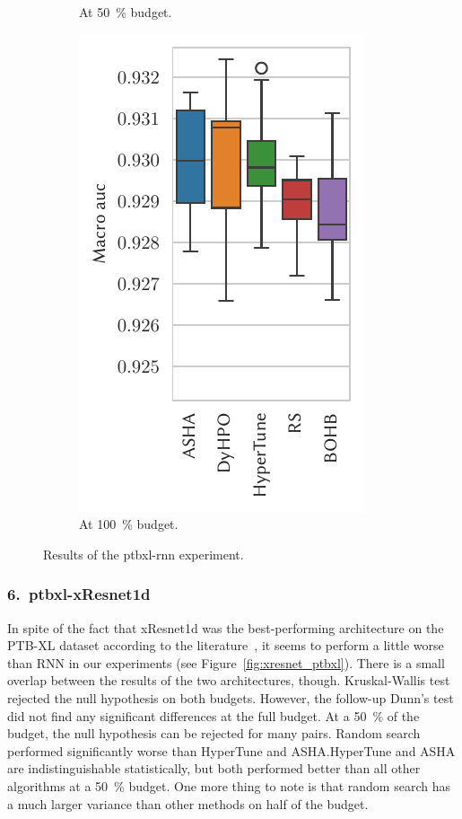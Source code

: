 \begin{figure}[H]
\begin{subfigure}{.26\textwidth}
        \caption{At \SI{50}{\percent} budget.}%
    \end{subfigure}%
    \begin{subfigure}{.26\textwidth}
        \includegraphics[height=\plotheight]{img/real_exp/ptbxl_rnn_boxplot_full.pdf}%
        \caption{At \SI{100}{\percent} budget.}%
    \end{subfigure}%
\caption{Results of the ptbxl-rnn experiment.}
\label{fig:rnn_ptbxl}
\end{figure}


\subsubsection{6.\ ptbxl-xResnet1d}
In spite of the fact that xResnet1d was the best-performing architecture on the PTB-XL dataset according to the literature~\cite{strodthoff2020deep}, it seems to perform a little worse than RNN in our experiments (see Figure~\ref{fig:xresnet_ptbxl}). There is a small overlap between the results of the two architectures, though. Kruskal-Wallis test rejected the null hypothesis on both budgets. However, the follow-up Dunn's test did not find any significant differences at the full budget. At a \SI{50}{\percent} of the budget, the null hypothesis can be rejected for many pairs. Random search performed significantly worse than HyperTune and ASHA.\@ HyperTune and ASHA are indistinguishable statistically, but both performed better than all other algorithms at a \SI{50}{\percent} budget. One more thing to note is that random search has a much larger variance than other methods on half of the budget.

